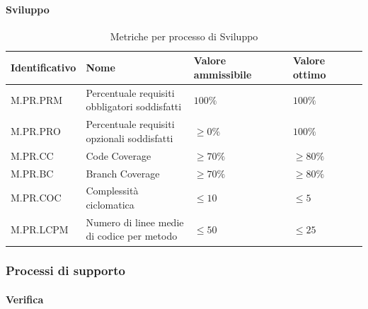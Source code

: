 \paragraph{Sviluppo}
\begin{table}[H]
    \centering
    \begin{tabular}{| l | l | l | l |}
    \hline
    \textbf{Identificativo} & 
    \textbf{Nome} &
    \textbf{Valore ammissibile} &
    \textbf{Valore ottimo}\\
    \hline
        M.PR.PRM & \makecell{Percentuale requisiti \\ obbligatori soddisfatti} & $100\%$ & $100\%$ \\
    \hline
        M.PR.PRO & \makecell{Percentuale requisiti \\ opzionali soddisfatti} & $\geq 0\%$ & $100\%$ \\   
    \hline
        M.PR.CC & Code Coverage & $\geq 70\%$ & $\geq 80\%$ \\
    \hline
        M.PR.BC & Branch Coverage & $\geq 70\%$ & $\geq 80\%$ \\
    \hline
        M.PR.COC & Complessità ciclomatica & $\leq 10$ & $\leq 5$ \\
    \hline
        M.PR.LCPM & \makecell{Numero di linee medie \\ di codice per metodo} & $\leq 50$ & $\leq 25$ \\
    \hline
\end{tabular}
\caption{Metriche per processo di Sviluppo}
\label{tab:metriche_sviluppo} 
\end{table}

\subsubsection{Processi di supporto}

\paragraph{Verifica}
\begin{table}[H]
    \centering
\caption{Metriche per processo di Verifica}
\label{tab:metriche_verifica} 
\end{table}

